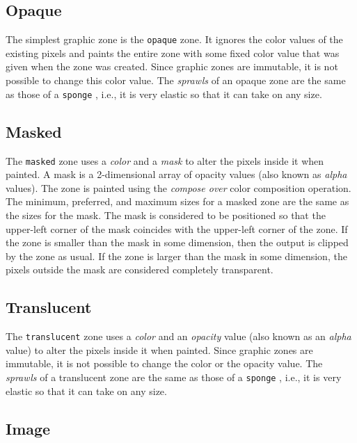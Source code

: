 \documentclass{report}
\def\code#1{\texttt{#1}}
\begin{document}
\subsection{Opaque}
\label{sec-zones-graphic-opaque}

The simplest graphic zone is the \code{opaque} zone.  It ignores the
color values of the existing pixels and paints the entire zone with
some fixed color value that was given when the zone was created.
Since graphic zones are immutable, it is not possible to change this
color value.  The \emph{sprawls} of an opaque zone are the same as
those of a \code{sponge} , i.e., it
is very elastic so that it can take on any size. 

\subsection{Masked}
\label{sec-zones-graphic-masked}

The \code{masked} zone uses a \emph{color} and a \emph{mask} to alter
the pixels inside it when painted.  A mask is a 2-dimensional array of
opacity values (also known as \emph{alpha} values).  The zone is
painted using the \emph{compose over} color composition operation.
The minimum, preferred, and maximum sizes for a masked zone are the
same as the sizes for the mask.  The mask is considered to be
positioned so that the upper-left corner of the mask coincides with
the upper-left corner of the zone.  If the zone is smaller than the
mask in some dimension, then the output is clipped by the zone as
usual.  If the zone is larger than the mask in some dimension, the
pixels outside the mask are considered completely transparent. 

\subsection{Translucent}
\label{sec-zones-graphic-translucent}

The \code{translucent} zone uses a \emph{color} and an \emph{opacity}
value (also known as an \emph{alpha} value) to alter the pixels inside
it when painted.  Since graphic zones are immutable, it is not
possible to change the color or the opacity value.  The \emph{sprawls}
of a translucent zone are the same as those of a \code{sponge}
, i.e., it is very elastic so that it
can take on any size.

\subsection{Image}
\label{sec-zones-graphic-image}
\end{document}
